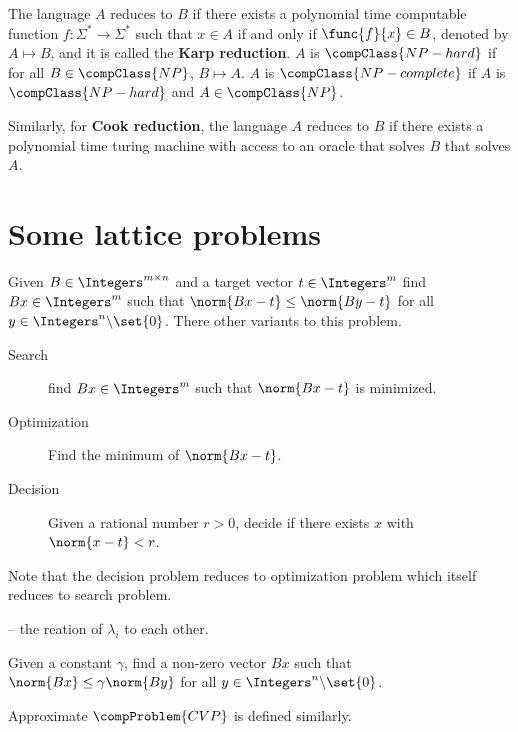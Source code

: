 The language \(A\) reduces to \(B\) if there exists a polynomial time computable function \(f:\Sigma^{\ast} \to \Sigma^{\ast}\) such that \(x \in A\) if and only if \(\func{f}{x} \in B\), denoted by \(A \mapsto B\), and it is called the \textbf{Karp reduction}. \(A\) is \(\compClass{NP-hard}\) if for all \(B \in \compClass{NP}\), \(B \mapsto A\). \(A\) is \(\compClass{NP-complete}\) if \(A\) is \(\compClass{NP-hard}\) and \(A \in \compClass{NP}\). 

Similarly, for \textbf{Cook reduction}, the language \(A\) reduces to \(B\) if there exists a polynomial time turing machine with access to an oracle that solves \(B\) that solves \(A\).

\section{Some lattice problems}
\begin{definition}
    Given \(B \in \Integers^{m \times n}\) and a target vector \(t \in \Integers^{m}\) find \(Bx \in \Integers^m\) such that \(\norm{Bx - t} \leq \norm{By - t}\) for all \(y \in \Integers^n \backslash \set{0}\). There other variants to this problem.
    \begin{description}
        \item[Search] find \(Bx \in \Integers^m\) such that \(\norm{Bx - t}\) is minimized.
        \item[Optimization] Find the minimum of \(\norm{Bx -t}\).
        \item[Decision] Given a rational number \(r > 0\), decide if there exists \(x\) with \(\norm{x - t} < r\). 
    \end{description}
    Note that the decision problem reduces to optimization problem which itself reduces to search problem.
\end{definition}
-- the reation of \(\lambda_i\) to each other.
\begin{definition}
    Given a constant \(\gamma\), find a non-zero vector \(Bx\) such that \(\norm{Bx} \leq \gamma\norm{By}\) for all \(y \in \Integers^{n} \backslash \set{0}\).
\end{definition}
Approximate \(\compProblem{CVP}\) is defined similarly.

